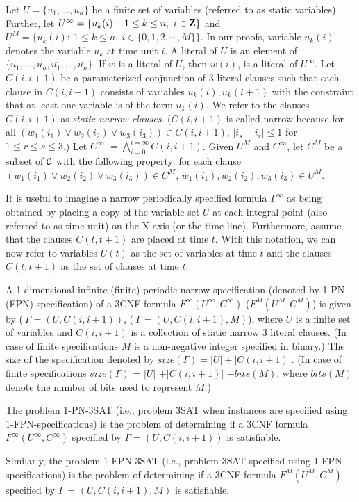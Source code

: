 Let $U = \{u_1, \ldots, u_n \}$  be a finite set of variables (referred to
as static variables).
Further, let
$U^{\infty} =  \{u_k(i): ~ 1 \leq k \leq n, ~ i \in {\bf Z}\}$ and 
$U^{M} =  \{u_k(i): ~ 1 \leq k \leq n, ~ i \in \{0,1, 2, \cdots, M\}\}$. 
In our proofs, variable $u_k(i)$
denotes the variable $u_k$ at time unit $i$. 
A literal of $U$ is an element of 
$\{u_1, \ldots, u_n, \overline{u_1}, \ldots, \overline{u_n} \}$.
If $w$ is a literal of $U$, then $w(i)$, 
is a literal of $U^{\infty}$.
Let $C(i, i+1)$ be a parameterized conjunction of 3 literal clauses
such that each clause in $C(i, i+1)$ 
consists of variables $u_k(i), u_k(i+1)$ with the constraint that at least one
variable is of the form $u_k(i)$. 
We refer to the clauses $C(i, i+1)$ as  {\em static narrow clauses}. 
($C(i, i+1)$ is called  narrow because
for all  $(w_1(i_1) \vee w_2(i_2) \vee w_3(i_3)) \in C(i,i+1) $, 
$|i_s - i_r| \leq 1$ for $1 \leq r \leq s \leq 3$.)
Let $C^{\infty}$ $= \bigwedge_{i = 0}^{i =\infty}C(i, i+1)$. 
Given $U^{M}$ and $C^{\infty}$, let $C^{M}$ be a subset of $\cal C$ 
with the following property: for each clause 
$(w_1(i_1) \vee w_2(i_2) \vee w_3(i_3))  \in C^{M}$,
$ w_1(i_1), w_2(i_2), w_3(i_3) \in U^{M}$.



It is useful to imagine a narrow periodically specified formula
$\Gamma^{\infty}$ as being obtained by placing a copy of the variable 
set $U$
at each integral point (also referred to as time unit) 
on the X-axis (or the time line). 
Furthermore, assume that the clauses $C(t, t+1)$ are placed at time $t$.
With this notation, we can now refer to variables $U(t)$
as the set of variables at time $t$ 
and the clauses $C(t, t+1)$ as the set of clauses at time $t$.




\begin{definition}\label{fpn:sat}
A 1-dimensional infinite (finite) 
periodic narrow specification (denoted by 1-PN (FPN)-specification)
of a  3CNF formula  $F^{\infty}(U^{\infty}, C^{\infty})$
($F^{M}(U^{M}, C^{M})$) is given by 
($~\Gamma = (U,C(i,i+1))$,  ($~\Gamma = (U,C(i, i+1), M)$),  
where $U$ is  a finite set of variables and
$C(i, i+1)$ is a collection of static narrow 3 literal clauses. 
(In case of finite specifications $M$ is a non-negative integer 
specified in binary.)
The size of the specification denoted by 
$size(\Gamma) = |U| + |C(i, i+1)| $. (In case of finite specifications
$size(\Gamma)$ = $|U|$ $+ |C(i, i+1)|$ $+ bits(M)$,  
where $bits(M)$ denote the number
of bits used to represent $M$.)

\smallskip

The problem 1-PN-3SAT (i.e., problem 3SAT when instances are specified using 
1-FPN-specifications)  is the problem of determining if a 3CNF formula
$F^{\infty}(U^{\infty}, C^{\infty})$ specified by $\Gamma= (U,C(i, i+1))$ 
is satisfiable.

\smallskip

Similarly, the problem 1-FPN-3SAT (i.e., problem 3SAT specified using 
1-FPN-specifications)  is the problem of determining if a 3CNF formula
$F^{M}(U^{M}, C^{M})$ specified by $\Gamma$ = $(U,C(i, i+1),M)$ 
is satisfiable.
\end{definition}


